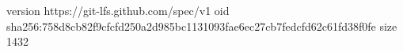 version https://git-lfs.github.com/spec/v1
oid sha256:758d8cb82f9cfcfd250a2d985bc1131093fae6ec27cb7fedcfd62c61fd38f0fe
size 1432

